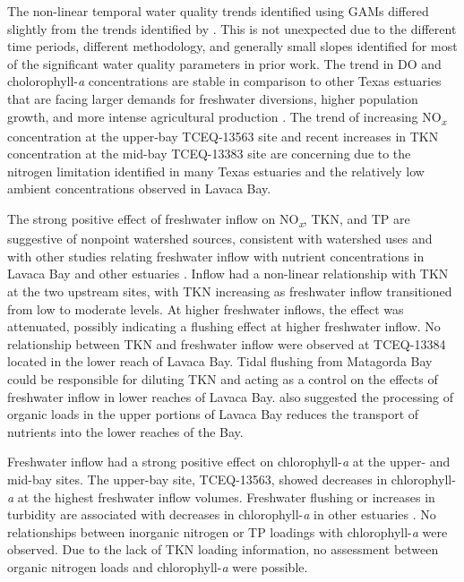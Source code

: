 \documentclass[water,article,submit,oneauthor]{Definitions/mdpi}
\begin{document}
The non-linear temporal water quality trends identified using GAMs
differed slightly from the trends identified by
\citet{bugica_water_2020}. This is not unexpected due to the different
time periods, different methodology, and generally small slopes
identified for most of the significant water quality parameters in prior
work. The trend in DO and cholorophyll-\emph{a} concentrations are
stable in comparison to other Texas estuaries that are facing larger
demands for freshwater diversions, higher population growth, and more
intense agricultural production
\citep{wetzWaterQualityDynamics2016, bugica_water_2020}. The trend of
increasing NO\textsubscript{\emph{x}} concentration at the upper-bay
TCEQ-13563 site and recent increases in TKN concentration at the mid-bay
TCEQ-13383 site are concerning due to the nitrogen limitation identified
in many Texas estuaries
\citep{gardnerNitrogenFixationDissimilatory2006, houTransformationFateNitrate2012, doradoUnderstandingInteractionsFreshwater2015, paudelRelationshipSuspendedSolids2019, wetz_exceptionally_2017}
and the relatively low ambient concentrations observed in Lavaca Bay.

The strong positive effect of freshwater inflow on
NO\textsubscript{\emph{x}}, TKN, and TP are suggestive of nonpoint
watershed sources, consistent with watershed uses and with other studies
relating freshwater inflow with nutrient concentrations in Lavaca Bay
and other estuaries
\citep{russell_effect_2006, caffreyHighNutrientPulses2007, peierlsNonmonotonicResponsesPhytoplankton2012, palmerImpactsDroughtsLow2015, ciraPhytoplanktonDynamicsLowInflow2021}.
Inflow had a non-linear relationship with TKN at the two upstream sites,
with TKN increasing as freshwater inflow transitioned from low to
moderate levels. At higher freshwater inflows, the effect was
attenuated, possibly indicating a flushing effect at higher freshwater
inflow. No relationship between TKN and freshwater inflow were observed
at TCEQ-13384 located in the lower reach of Lavaca Bay. Tidal flushing
from Matagorda Bay could be responsible for diluting TKN and acting as a
control on the effects of freshwater inflow in lower reaches of Lavaca
Bay. \citet{russell_effect_2006} also suggested the processing of
organic loads in the upper portions of Lavaca Bay reduces the transport
of nutrients into the lower reaches of the Bay.

Freshwater inflow had a strong positive effect on chlorophyll-\emph{a}
at the upper- and mid-bay sites. The upper-bay site, TCEQ-13563, showed
decreases in chlorophyll-\emph{a} at the highest freshwater inflow
volumes. Freshwater flushing or increases in turbidity are associated
with decreases in chlorophyll-\emph{a} in other estuaries
\citep{peierlsNonmonotonicResponsesPhytoplankton2012, cloernPhytoplanktonPrimaryProduction2014}.
No relationships between inorganic nitrogen or TP loadings with
chlorophyll-\emph{a} were observed. Due to the lack of TKN loading
information, no assessment between organic nitrogen loads and
chlorophyll-\emph{a} were possible.
\end{document}

